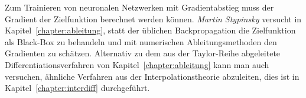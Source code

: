 Zum Trainieren von neuronalen Netzwerken mit Gradientabstieg muss 
der Gradient der Zielfunktion berechnet werden können.
{\em Martin Stypinsky} versucht in Kapitel~\ref{chapter:ableitung},
statt der üblichen Backpropagation
die Zielfunktion als Black-Box zu behandeln und mit numerischen
Ableitungsmethoden den Gradienten zu schätzen.
%
Alternativ zu dem aus der Taylor-Reihe abgeleitete Differentiationsverfahren
von Kapitel~\ref{chapter:ableitung} kann man auch versuchen, ähnliche
Verfahren aus der Interpolationstheorie abzuleiten, dies ist in
Kapitel~\ref{chapter:interdiff} durchgeführt.



